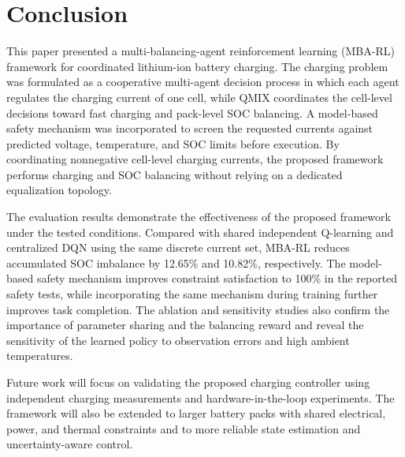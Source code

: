 \section{Conclusion}

This paper presented a multi-balancing-agent reinforcement learning (MBA-RL) framework for coordinated lithium-ion battery charging. The charging problem was formulated as a cooperative multi-agent decision process in which each agent regulates the charging current of one cell, while QMIX coordinates the cell-level decisions toward fast charging and pack-level SOC balancing. A model-based safety mechanism was incorporated to screen the requested currents against predicted voltage, temperature, and SOC limits before execution. By coordinating nonnegative cell-level charging currents, the proposed framework performs charging and SOC balancing without relying on a dedicated equalization topology.

The evaluation results demonstrate the effectiveness of the proposed framework under the tested conditions. Compared with shared independent Q-learning and centralized DQN using the same discrete current set, MBA-RL reduces accumulated SOC imbalance by 12.65\% and 10.82\%, respectively. The model-based safety mechanism improves constraint satisfaction to 100\% in the reported safety tests, while incorporating the same mechanism during training further improves task completion. The ablation and sensitivity studies also confirm the importance of parameter sharing and the balancing reward and reveal the sensitivity of the learned policy to observation errors and high ambient temperatures.

Future work will focus on validating the proposed charging controller using independent charging measurements and hardware-in-the-loop experiments. The framework will also be extended to larger battery packs with shared electrical, power, and thermal constraints and to more reliable state estimation and uncertainty-aware control.
